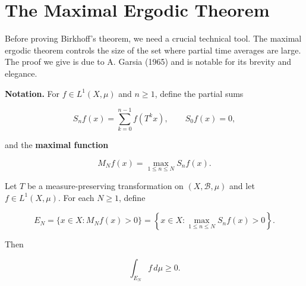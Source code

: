 \section{The Maximal Ergodic Theorem}\label{sec:9.4}

Before proving Birkhoff's theorem, we need a crucial technical tool. The maximal ergodic theorem controls the size of the set where partial time averages are large. The proof we give is due to A. Garsia (1965) and is notable for its brevity and elegance.

\textbf{Notation.} For $f \in L^1(X, \mu)$ and $n \geq 1$, define the partial sums

\[
S_n f(x) = \sum_{k=0}^{n-1} f(T^k x), \qquad S_0 f(x) = 0,
\]

and the \textbf{maximal function}

\[
M_N f(x) = \max_{1 \leq n \leq N} S_n f(x).
\]

\begin{theorem}\label{thm:9.5}
Let $T$ be a measure-preserving transformation on $(X, \mathcal{B}, \mu)$ and let $f \in L^1(X, \mu)$. For each $N \geq 1$, define

\[
E_N = \{ x \in X : M_N f(x) > 0 \} = \left\{ x \in X : \max_{1 \leq n \leq N} S_n f(x) > 0 \right\}.
\]

Then

\[
\int_{E_N} f \, d\mu \geq 0.
\]
\end{theorem}


